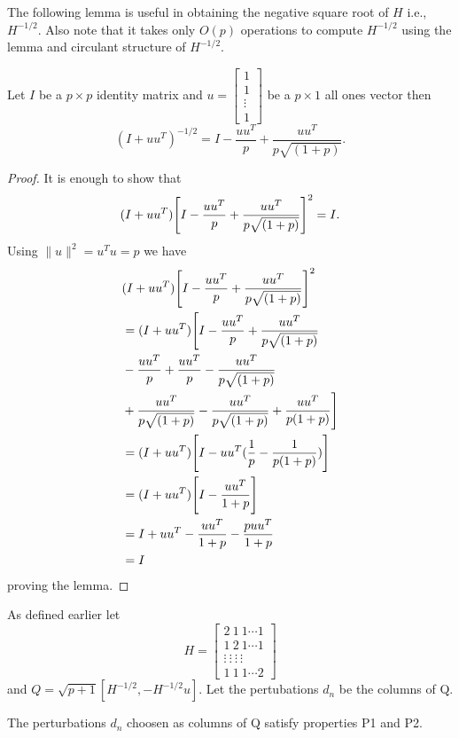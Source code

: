 The following lemma is useful in obtaining the negative square root of $H$ i.e., 
$H^{-1/2}$. Also note that it takes only $O(p)$ operations to compute $H^{-1/2}$
using the lemma and circulant structure of $H^{-1/2}$.
\begin{lemma}
 \label{lemma: gen Sherman-Morisson}
Let $I$ be a $p \times p$ identity matrix and $u = 
\left[
 \begin{array}{cccc}
 1 \\ 1 \\  \vdots \\ 1 
\end{array} \right]$ be a $p \times 1$ all ones vector then
$$ (I+uu^T)^{-1/2}= I-\frac{uu^T}{p}+\frac{uu^T}{p\sqrt{(1+p)}}.$$
\end{lemma}

\begin{proof}
It is enough to show that
$$(I+uu^T)\Bigg{[}I-\frac{uu^T}{p}+\frac{uu^T}{p\sqrt{(1+p)}}\Bigg{]}^2=I.$$
Using $\|u\|^2=u^Tu=p$ we have
\begin{align*}
 & (I+uu^T)\Bigg{[}I-\frac{uu^T}{p}+\frac{uu^T}{p\sqrt{(1+p)}}\Bigg{]}^2\\
 &= (I+uu^T)\Bigg{[}I-\frac{uu^T}{p}+\frac{uu^T}{p\sqrt{(1+p)}}\\
 &-\frac{uu^T}{p}+\frac{uu^T}{p}-\frac{uu^T}{p\sqrt{(1+p)}}\\
 &+\frac{uu^T}{p\sqrt{(1+p)}}-\frac{uu^T}{p\sqrt{(1+p)}}+\frac{uu^T}{p(1+p)}\Bigg{]}\\
 &=(I+uu^T)\Bigg{[}I-uu^T(\frac{1}{p}-\frac{1}{p(1+p)})\Bigg{]}\\
 &=(I+uu^T)\Bigg{[}I-\frac{uu^T}{1+p}\Bigg{]}\\
 &=I+uu^T-\frac{uu^T}{1+p}-\frac{puu^T}{1+p}\\
 &=I
\end{align*}
proving the lemma.
\end{proof}
As defined earlier let \begin{equation*} H = \left[\begin{array}{cccc}
2 \ 1 \ 1 \cdots 1\\ 
1 \ 2 \ 1 \cdots 1 \\
\vdots \ \vdots \ \vdots \ \vdots\\
1 \ 1 \ 1 \cdots 2
\end{array}\right]
\end{equation*}
and $Q=\sqrt{p+1}[H^{-1/2},-H^{-1/2}u].$
Let the pertubations $d_n$ be the columns of Q. 
\begin{lemma}
 The perturbations $d_n$ choosen as columns of Q satisfy properties P1 and P2.
\end{lemma}
